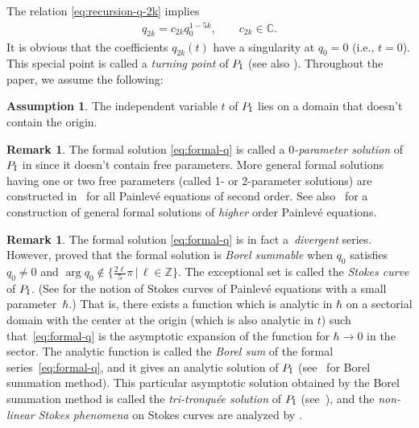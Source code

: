 \documentclass[pdftex]{sigma}
\theoremstyle{definition}
\newtheorem{rem}[thm]{Remark}
\newtheorem{ass}[thm]{Assumption}
\numberwithin{equation}{section}
\def\PI{P_{\rm I}}
\def\bbC{{\mathbb C}}
\begin{document}
The relation \eqref{eq:recursion-q-2k} implies
\begin{gather*}
q_{2k} =
c_{2k} q_{0}^{1-5k}, \qquad c_{2k} \in \bbC .
\end{gather*}
It is obvious that the coef\/f\/icients $q_{2k}(t)$ have
a singularity at $q_{0} = 0$ (i.e., $t = 0$).
This special point is called a {\em turning point} of $\PI$
\cite[Def\/inition 2.1]{KT-PI} (see also \cite[Section~4]{KT05}).
Throughout the paper, we assume the following:

\begin{ass}
The independent variable $t$ of $\PI$
lies on a domain that doesn't contain the origin.
\end{ass}


\begin{rem}
The formal solution \eqref{eq:formal-q} is called a
{\em $0$-parameter solution} of $\PI$ in \cite{KT05}
since it doesn't contain free parameters.
More general formal solutions having
one or two free para\-me\-ters (called 1- or 2-parameter solutions)
are constructed in~\cite{AKT-P} for all Painlev\'e equations
of second order.
See also~\cite{Umeta} for a construction of general formal
solutions of {\em higher} order Painlev\'e equations.
\end{rem}

\begin{rem}\sloppy
The formal solution \eqref{eq:formal-q} is in fact a~{\em divergent} series.
However, \cite[Theo\-rem~1.1]{Kamimoto-Koike} proved that
the formal solution is {\em Borel summable} when
$q_{0}$ satisf\/ies $q_{0} \ne 0$ and
\mbox{$\arg q_{0} \notin \{ \frac{2\ell}{5}\pi \,|\,
\ell \in {\mathbb Z} \}$}.
The exceptional set is called the {\em Stokes curve} of $\PI$.
(See \cite[Def\/ini\-tion~2.1]{KT-PI} for the notion of
Stokes curves of Painlev\'e equations
with a small parameter~$\hbar$.)
That is, there exists a function
which is analytic in $\hbar$ on a sectorial domain
with the center at the origin (which is also analytic in $t$)
such that~\eqref{eq:formal-q} is the asymptotic expansion
of the function for $\hbar \rightarrow 0$ in the sector.
The analytic function is called the {\em Borel sum}
of the formal series~\eqref{eq:formal-q}, and
it gives an analytic solution of $\PI$
(see~\cite{Costin08} for Borel summation method).
This particular asymptotic solution obtained by
the Borel summation method is called
the {\em tri-tronqu\'ee solution}
of $\PI$ (see~\cite{Joshi-Kitaev}), and the
{\em non-linear Stokes phenomena} on Stokes curves
are analyzed by \cite{FIKN, Kap, Takei}.
\end{rem}
\end{document}
